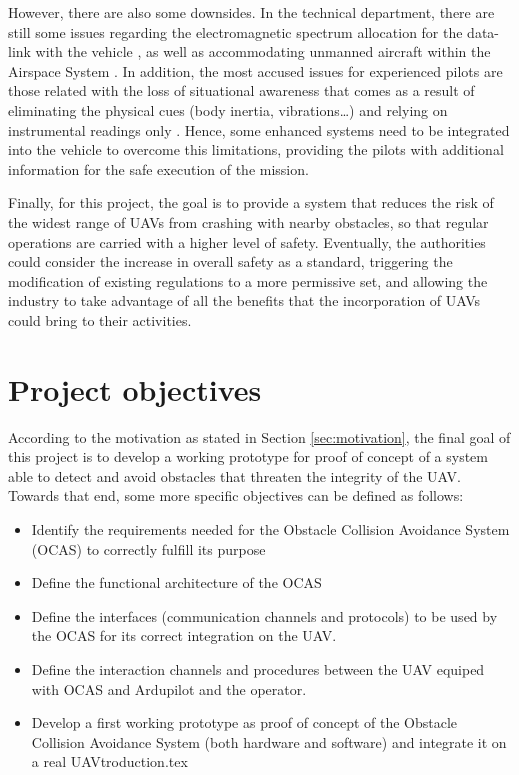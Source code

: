 However, there are also some downsides.
In the technical department, there are still some issues regarding the electromagnetic spectrum allocation for the data-link with the vehicle \cite{civilianunmannedaerialvehiclesreadyfortakeoff2012}, as well as accommodating unmanned aircraft within the Airspace System \cite{unmannedaircraftsystemsperceptionsandpotentials2013}.
In addition, the most accused issues for experienced pilots are those related with the loss of situational awareness that comes as a result of eliminating the physical cues (body inertia, vibrations\ldots) and relying on instrumental readings only \cite{bergqvist2014}.
Hence, some enhanced systems need to be integrated into the vehicle to overcome this limitations, providing the pilots with additional information for the safe execution of the mission.

Finally, for this project, the goal is to provide a system that reduces the risk of the widest range of UAVs from crashing with nearby obstacles, so that regular operations are carried with a higher level of safety.
Eventually, the authorities could consider the increase in overall safety as a standard, triggering the modification of existing regulations to a more permissive set, and allowing the industry to take advantage of all the benefits that the incorporation of UAVs could bring to their activities.

\section{Project objectives} \label{sec:objectives}

According to the motivation as stated in Section \ref{sec:motivation}, the final goal of this project is to develop a working prototype for proof of concept of a system able to detect and avoid obstacles that threaten the integrity of the UAV.
Towards that end, some more specific objectives can be defined as follows:

\begin{itemize}
	\item Identify the requirements needed for the Obstacle Collision Avoidance System (OCAS) to correctly fulfill its purpose
	\item Define the functional architecture of the OCAS
	\item Define the interfaces (communication channels and protocols) to be used by the OCAS for its correct integration on the UAV.
	\item Define the interaction channels and procedures between the UAV equiped with OCAS and Ardupilot and the operator.
	\item Develop a first working prototype as proof of concept of the Obstacle Collision Avoidance System (both hardware and software) and integrate it on a real UAVtroduction.tex
\end{itemize}

